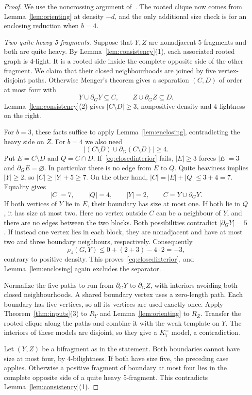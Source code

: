 \documentclass[11pt]{article}
\theoremstyle{remark}
\numberwithin{equation}{section}
\newcommand{\Ke}{K_7^{=}}
\newcommand{\dd}{\partial}
\begin{document}
\begin{proof}
We use the noncrossing argument of~\cite[Lemma~5.9 and Corollary~5.10]{DNR26}. The rooted clique now comes from Lemma~\ref{lem:orienting} at density $-d$, and the only additional size check is for an enclosing reduction when $b=4$.

\smallskip\noindent\emph{Two quite heavy 5-fragments.}
Suppose that $Y,Z$ are nonadjacent 5-fragments and both are quite heavy. By Lemma~\ref{lem:consistency}(1), each associated rooted graph is $4$-light. It is a rooted side inside the complete opposite side of the other fragment. We claim that their closed neighbourhoods are joined by five vertex-disjoint paths. Otherwise Menger's theorem gives a separation $(C,D)$ of order at most four with
\[
Y\cup\dd_GY\subseteq C,\qquad Z\cup\dd_GZ\subseteq D.
\]
Lemma~\ref{lem:consistency}(2) gives $|C\setminus D|\ge3$, nonpositive density and $4$-lightness on the right.

For $b=3$, these facts suffice to apply Lemma~\ref{lem:enclosing}, contradicting the heavy side on $Z$. For $b=4$ we also need
\begin{equation}\label{eq:closedinterior}
|(C\setminus D)\cup\dd_G(C\setminus D)|\ge4.
\end{equation}
Put $E=C\setminus D$ and $Q=C\cap D$. If~\eqref{eq:closedinterior} fails, $|E|\ge3$ forces $|E|=3$ and $\dd_GE=\varnothing$. In particular there is no edge from $E$ to $Q$. Quite heaviness implies $|Y|\ge2$, so $|C|\ge|Y|+5\ge7$. On the other hand, $|C|=|E|+|Q|\le3+4=7$. Equality gives
\[
|C|=7,\qquad |Q|=4,\qquad |Y|=2,
\qquad C=Y\cup\dd_GY.
\]
If both vertices of $Y$ lie in $E$, their boundary has size at most one. If both lie in $Q$, it has size at most two. Here no vertex outside $C$ can be a neighbour of $Y$, and there are no edges between the two blocks. Both possibilities contradict $|\dd_GY|=5$. If instead one vertex lies in each block, they are nonadjacent and have at most two and three boundary neighbours, respectively. Consequently
\[
\rho_4(G,Y)\le0+(2+3)-4\cdot2=-3,
\]
contrary to positive density. This proves~\eqref{eq:closedinterior}, and Lemma~\ref{lem:enclosing} again excludes the separator.

Normalize the five paths to run from $\dd_GY$ to $\dd_GZ$, with interiors avoiding both closed neighbourhoods. A shared boundary vertex uses a zero-length path. Each boundary has five vertices, so all its vertices are used exactly once. Apply Theorem~\ref{thm:inputs}(3) to $R_Y$ and Lemma~\ref{lem:orienting} to $R_Z$. Transfer the rooted clique along the paths and combine it with the weak template on $Y$. The interiors of these models are disjoint, so they give a $\Ke$ model, a contradiction.

Let $(Y,Z)$ be a bifragment as in the statement. Both boundaries cannot have size at most four, by $4$-bilightness. If both have size five, the preceding case applies. Otherwise a positive fragment of boundary at most four lies in the complete opposite side of a quite heavy 5-fragment. This contradicts Lemma~\ref{lem:consistency}(1).
\end{proof}
\end{document}
